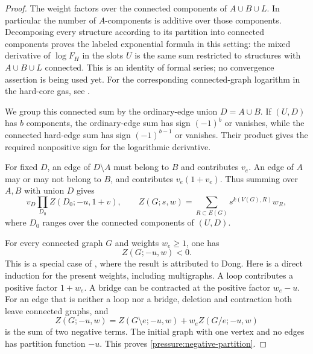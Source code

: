 \begin{proof}
The weight factors over the connected components of $A\cup B\cup L$.
In particular the number of $A$-components is additive over those
components. Decomposing every structure according to its partition
into connected components proves the labeled exponential formula in
this setting: the mixed derivative of $\log F_H$ in the slots $U$ is
the same sum restricted to structures with $A\cup B\cup L$ connected.
This is an identity of formal series; no convergence assertion is
being used yet.
For the corresponding connected-graph logarithm in the hard-core gas,
see \cite[Proposition~2.1]{ScottSokal2005RepulsiveGas}.

We group this connected sum by the ordinary-edge union $D=A\cup B$.
If $(U,D)$ has $b$ components, the ordinary-edge sum has sign
$(-1)^b$ or vanishes, while the connected hard-edge sum has sign
$(-1)^{b-1}$ or vanishes. Their product gives the required nonpositive
sign for the logarithmic derivative.

For fixed $D$, an edge of $D\setminus A$ must
belong to $B$ and contributes $v_e$. An edge of $A$ may or may not
belong to $B$, and contributes $v_e(1+v_e)$. Thus summing over $A,B$
with union $D$ gives
\begin{equation}
 v_D\prod_{D_0}Z(D_0;-u,1+v),
 \qquad
 Z(G;s,w)=\sum_{R\subset E(G)}s^{k(V(G),R)}w_R,
 \label{pressure:fixed-union}
\end{equation}
where $D_0$ ranges over the connected components of $(U,D)$.

For every connected graph $G$ and weights $w_e\ge1$, one has
\begin{equation}
 Z(G;-u,w)<0.
 \label{pressure:negative-partition}
\end{equation}
This is a special case of \cite[Theorem~4.4]{JacksonSokal2009TutteZeros},
where the result is attributed to Dong. Here is a direct induction
for the present weights, including multigraphs. A loop contributes a
positive factor $1+w_e$. A bridge can be contracted at the positive
factor $w_e-u$. For an edge that is neither a loop nor a bridge,
deletion and contraction both leave connected graphs, and
\[
 Z(G;-u,w)=Z(G\setminus e;-u,w)+w_e Z(G/e;-u,w)
\]
is the sum of two negative terms. The initial graph with one vertex
and no edges has partition function $-u$. This proves
\eqref{pressure:negative-partition}.


\end{proof}

